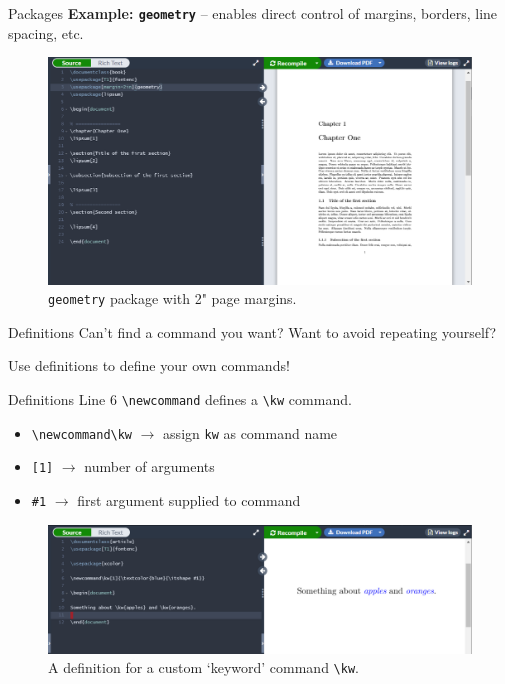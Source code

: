 \documentclass{beamer}
\begin{document}
{  \begin{frame}{Packages}
    \textbf{Example: \texttt{geometry}} -- enables direct control of margins, borders, line spacing, etc.
    \begin{figure}
      \includegraphics[width=0.9\linewidth]{day01-overleaf-08D-package-geom-redux.png}
      \caption{\texttt{geometry} package with 2" page margins.}
      \label{fig:day01-overleaf-08D}
    \end{figure}
  \end{frame}

  \begin{frame}{Definitions}
    Can't find a command you want? Want to avoid repeating yourself? 

    Use definitions to define your own commands!
  \end{frame}

  \begin{frame}{Definitions}
    Line 6 \texttt{\textbackslash newcommand} defines a \texttt{\textbackslash kw} command.
    \begin{itemize}
      \item \texttt{\textbackslash newcommand\textbackslash kw} $\to$ assign \texttt{kw} as command name
      \item \texttt{[1]} $\to$ number of arguments
      \item \texttt{\#1} $\to$ first argument supplied to command
    \end{itemize}
    \begin{figure}
      \includegraphics[width=0.9\linewidth]{day01-overleaf-09A-defn.png}
      \caption{A definition for a custom `keyword' command \texttt{\textbackslash kw}.}
      \label{fig:day01-overleaf-09A}
    \end{figure}
  \end{frame}

}
\end{document}
